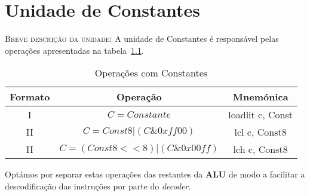 \chapter{Unidade de Constantes}
\textsc{Breve descrição da unidade: } A unidade de Constantes é responsável pelas operações apresentadas na tabela~\ref{tabela:constantes}.
\begin{table}[h]
	\centering
	\begin{tabular}{|c|c|c|}
		\hline
		Formato & Operação & Mnemónica \\ \hline
		I & \mbox{$C=Constante$} & loadlit c, Const  \\ \hline
		II & \mbox{$C=Const8|(C\&0xff00)$}  & lcl c, Const8 \\ \hline
		II & \mbox{$C=(Const8<<8)|(C\&0x00ff)$}  & lch c, Const8 \\ \hline
	\end{tabular}
	\caption{Operações com Constantes}
	\label{tabela:constantes}
\end{table}

Optámos por separar estas operações das restantes da \textbf{ALU} de modo a facilitar a descodificação das instruções por parte do \textit{decoder}.